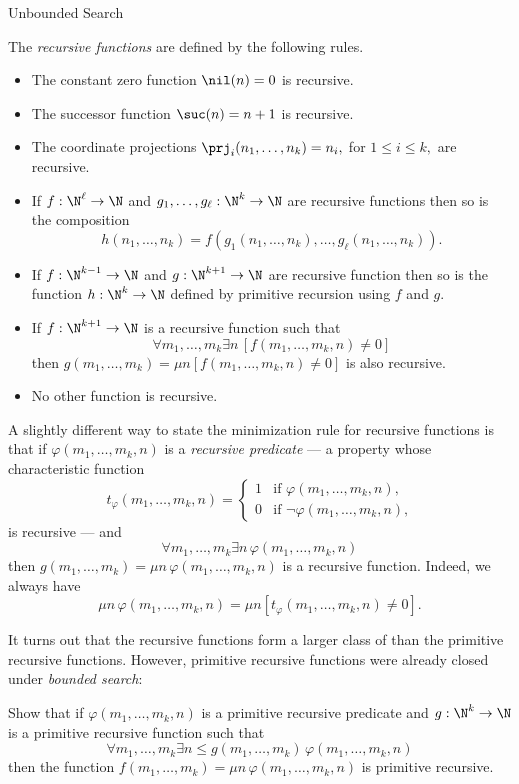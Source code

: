\begin{unit}{Unbounded Search}
\begin{definition}\label{D:Recursive}
  The \emph{recursive functions} are defined by the following rules.
  \begin{itemize}
  \item The constant zero function \(\nil(n) = 0\) is recursive.
  \item The successor function \(\suc(n) = n+1\) is recursive.
  \item The coordinate projections \(\prj_i(n_1,\dots,n_k) = n_i,\) for \(1 \leq i \leq k,\) are recursive.
  \item If \(f:\N^\ell\to\N\) and \(g_1,\dots,g_\ell:\N^k\to\N\) are recursive functions then so is the composition \[h(n_1,\dots,n_k) = f(g_1(n_1,\dots,n_k),\dots,g_\ell(n_1,\dots,n_k)).\]
  \item If \(f:\N^{k-1}\to\N\) and \(g:\N^{k+1}\to\N\) are recursive function then so is the function \(h:\N^k\to\N\) defined by primitive recursion using \(f\) and \(g.\)
  \item If \(f:\N^{k+1}\to\N\) is a recursive function such that \[\forall m_1,\dots,m_k \exists n\,[f(m_1,\dots,m_k,n) \neq 0]\] then \(g(m_1,\dots,m_k) = \mu n[f(m_1,\dots,m_k,n) \neq 0]\) is also recursive.
  \item No other function is recursive.
  \end{itemize}
\end{definition}

\noindent
A slightly different way to state the minimization rule for recursive functions is that if \(\varphi(m_1,\dots,m_k,n)\) is a \emph{recursive predicate} --- a property whose characteristic function \[t_\varphi(m_1,\dots,m_k,n) = \begin{cases} 1 & \text{if $\varphi(m_1,\dots,m_k,n)$,} \\ 0 & \text{if $\lnot\varphi(m_1,\dots,m_k,n)$,} \end{cases}\] is recursive --- and \[\forall m_1,\dots,m_k \exists n\,\varphi(m_1,\dots,m_k,n)\] then \(g(m_1,\dots,m_k) = \mu n\,\varphi(m_1,\dots,m_k,n)\) is a recursive function.
Indeed, we always have \[\mu n\,\varphi(m_1,\dots,m_k,n) = \mu n[t_\varphi(m_1,\dots,m_k,n) \neq 0].\]

It turns out that the recursive functions form a larger class of than the primitive recursive functions.
However, primitive recursive functions were already closed under \emph{bounded search}:

\begin{problem}
Show that if \(\varphi(m_1,\dots,m_k,n)\) is a primitive recursive predicate and \(g:\N^k\to\N\) is a primitive recursive function such that \[\forall m_1,\dots,m_k \exists n \leq g(m_1,\dots,m_k)\,\varphi(m_1,\dots,m_k,n)\] then the function \(f(m_1,\dots,m_k) = \mu n\,\varphi(m_1,\dots,m_k,n)\) is primitive recursive.
\end{problem}


\end{unit}
